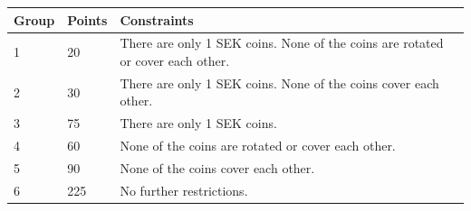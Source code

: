 \noindent
\begin{tabular}{| l | l | l |}
\hline
Group & Points & Constraints \\ \hline
1     & 20     & There are only 1 SEK coins. None of the coins are rotated or cover each other. \\ \hline
2     & 30     & There are only 1 SEK coins. None of the coins cover each other. \\ \hline
3     & 75     & There are only 1 SEK coins. \\ \hline
4     & 60     & None of the coins are rotated or cover each other. \\ \hline
5     & 90     & None of the coins cover each other. \\ \hline
6     & 225     & No further restrictions. \\ \hline
\end{tabular}
